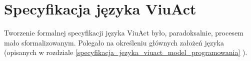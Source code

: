 \section{Specyfikacja języka ViuAct}

Tworzenie formalnej specyfikacji języka ViuAct było, paradoksalnie, procesem mało sformalizowanym. Polegało
na określeniu głównych założeń języka (opisanych w rozdziale
\ref{specyfikacja_jezyka_viuact_model_programowania}
).
